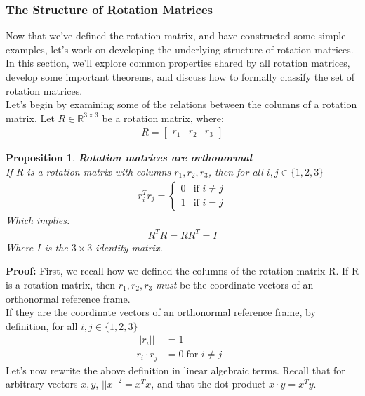 \documentclass[oneside]{book}
\newtheorem{proposition}{Proposition}
\newenvironment{prop} %
  {\colorlet{shadecolor}{blue!9}\begin{shaded}\begin{proposition}}
  {\end{proposition}\end{shaded}}
\begin{document}
\subsubsection{The Structure of Rotation Matrices}
Now that we've defined the rotation matrix, and have constructed some simple examples, let's work on developing the underlying structure of rotation matrices.\\
In this section, we'll explore common properties shared by all rotation matrices, develop some important theorems, and discuss how to formally classify the set of rotation matrices.\\
Let's begin by examining some of the relations between the columns of a rotation matrix. Let $R \in \mathbb{R}^{3\times 3}$ be a rotation matrix, where:
\begin{align}
    R = \begin{bmatrix}
    r_1 & r_2 & r_3
    \end{bmatrix}
\end{align}
\begin{prop}
\textbf{Rotation matrices are orthonormal}\\
If $R$ is a rotation matrix with columns $r_1, r_2, r_3$, then for all $i, j \in \{1, 2, 3\}$
\begin{align}
    r_i^Tr_j = \begin{cases}
        0 & \text{if } i \neq j\\
        1 & \text{if } i = j
    \end{cases}
\end{align}
Which implies:
\begin{align}
    R^TR = RR^T = I
\end{align}
Where $I$ is the $3\times3$ identity matrix.
\end{prop}\noindent
\textbf{Proof:} First, we recall how we defined the columns of the rotation matrix R. If R is a rotation matrix, then $r_1, r_2, r_3$ \textit{must} be the coordinate vectors of an orthonormal reference frame.\\
If they are the coordinate vectors of an orthonormal reference frame, by definition, for all $i, j \in \{1, 2, 3\}$
\begin{align}
    ||r_i|| &= 1\\
    r_i\cdot r_j &= 0 \; \text{for $i\neq j$ }
\end{align}
Let's now rewrite the above definition in linear algebraic terms. Recall that for arbitrary vectors $x, y$, $||x||^2 = x^Tx$, and that the dot product $x\cdot y = x^T y$.\\
\end{document}
